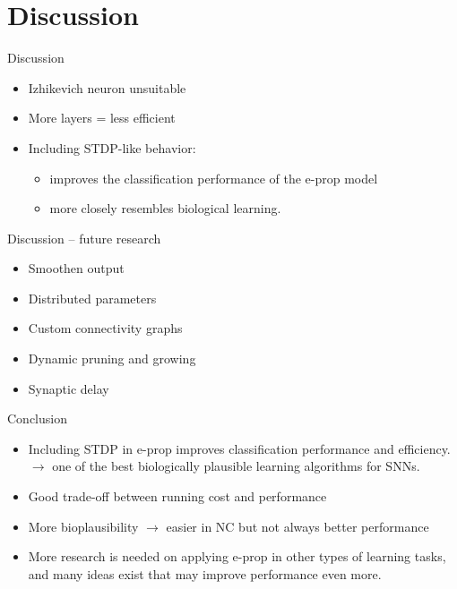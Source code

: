\documentclass[t]{beamer}
\begin{document}
\section{Discussion}
\begin{frame}{Discussion}
  \begin{itemize}[label=--]
    \item Izhikevich neuron unsuitable
    \item More layers = less efficient
    \item Including STDP-like behavior:
    \begin{itemize}[label=--]
      \item improves the classification performance of the e-prop model
      \item more closely resembles biological learning.
    \end{itemize}
  \end{itemize}
\end{frame}

\begin{frame}{Discussion -- future research}
  \begin{itemize}[label=--]
    \item Smoothen output
    \item Distributed parameters
    \item Custom connectivity graphs
    \item Dynamic pruning and growing
    \item Synaptic delay
  \end{itemize}
\end{frame}

\begin{frame}{Conclusion}
  \begin{itemize}[label=--]
    \item Including STDP in e-prop improves classification performance and efficiency.\\
    $\rightarrow$ one of the best biologically plausible learning algorithms for SNNs.
    \item Good trade-off between running cost and performance
    \item More bioplausibility $\rightarrow$ easier in NC but not always better performance
    \item More research is needed on applying e-prop in other types of learning tasks, and many ideas exist that may improve performance even more.
  \end{itemize}
\end{frame}
\end{document}
